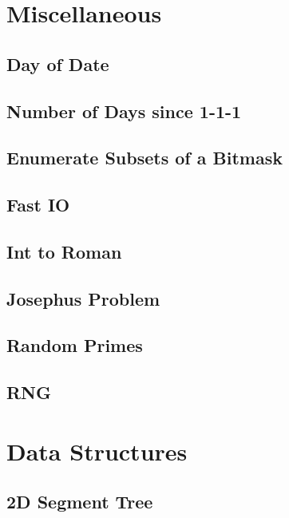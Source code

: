 \section{Miscellaneous}
\subsection{Day of Date}

\subsection{Number of Days since 1-1-1}

\subsection{Enumerate Subsets of a Bitmask}

\subsection{Fast IO}

\subsection{Int to Roman}

\subsection{Josephus Problem}

\subsection{Random Primes}

\subsection{RNG}

\section{Data Structures}
\subsection{2D Segment Tree}

